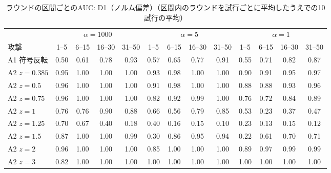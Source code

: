 \documentclass[a4j, twocolumn, dvipdfmx]{jsarticle}
\begin{document}
\begin{table}[H]
\centering
\caption{ラウンドの区間ごとのAUC: D1（ノルム偏差）（区間内のラウンドを試行ごとに平均したうえでの10試行の平均）}
\label{tab:seg-d1}
\footnotesize
\tabcolsep=3.2pt
\begin{tabular}{@{}l@{\hspace{5pt}}cccc@{\hspace{8pt}}cccc@{\hspace{8pt}}cccc@{}}
\toprule
 & \multicolumn{4}{c}{$\alpha=1000$} & \multicolumn{4}{c}{$\alpha=5$} & \multicolumn{4}{c}{$\alpha=1$} \\
\cmidrule(lr){2-5}\cmidrule(lr){6-9}\cmidrule(l){10-13}
攻撃 & 1--5 & 6--15 & 16--30 & 31--50 & 1--5 & 6--15 & 16--30 & 31--50 & 1--5 & 6--15 & 16--30 & 31--50 \\
\midrule
A1 符号反転 & 0.50 & 0.61 & 0.78 & 0.93 & 0.57 & 0.65 & 0.77 & 0.91 & 0.55 & 0.71 & 0.82 & 0.87 \\
\midrule
A2 $z{=}0.385$ & 0.95 & 1.00 & 1.00 & 1.00 & 0.93 & 0.98 & 1.00 & 1.00 & 0.90 & 0.91 & 0.95 & 0.97 \\
A2 $z{=}0.5$ & 0.96 & 1.00 & 1.00 & 1.00 & 0.91 & 0.98 & 1.00 & 1.00 & 0.88 & 0.88 & 0.93 & 0.96 \\
A2 $z{=}0.75$ & 0.96 & 1.00 & 1.00 & 1.00 & 0.82 & 0.92 & 0.99 & 1.00 & 0.76 & 0.72 & 0.84 & 0.89 \\
A2 $z{=}1$ & 0.76 & 0.76 & 0.90 & 0.88 & 0.66 & 0.56 & 0.79 & 0.85 & 0.53 & 0.23 & 0.37 & 0.47 \\
A2 $z{=}1.25$ & 0.70 & 0.67 & 0.40 & 0.18 & 0.40 & 0.16 & 0.15 & 0.10 & 0.23 & 0.13 & 0.15 & 0.12 \\
A2 $z{=}1.5$ & 0.87 & 1.00 & 1.00 & 0.99 & 0.30 & 0.86 & 0.95 & 0.94 & 0.22 & 0.61 & 0.70 & 0.71 \\
A2 $z{=}2$ & 0.96 & 1.00 & 1.00 & 1.00 & 0.85 & 1.00 & 1.00 & 1.00 & 0.89 & 0.97 & 0.99 & 0.99 \\
A2 $z{=}3$ & 0.82 & 1.00 & 1.00 & 1.00 & 1.00 & 1.00 & 1.00 & 1.00 & 1.00 & 1.00 & 1.00 & 1.00 \\
\bottomrule
\end{tabular}
\end{table}
\end{document}
